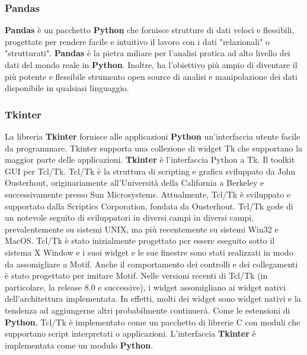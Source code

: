 \subsubsection{Pandas}
\textbf{Pandas} è un pacchetto \textbf{Python} che fornisce strutture di dati veloci e flessibili, progettate per rendere facile e intuitivo il lavoro con i dati "relazionali" o "strutturati". \textbf{Pandas} è la pietra miliare per l'analisi pratica ad alto livello dei dati del mondo reale in \textbf{Python}. Inoltre, ha l'obiettivo più ampio di diventare il più potente e flessibile strumento open source di analisi e manipolazione dei dati disponibile in qualsiasi linguaggio\cite{reback2020pandas}. 

\subsubsection{Tkinter}
La libreria \textbf{Tkinter} fornisce alle applicazioni \textbf{Python} un'interfaccia utente facile da programmare. Tkinter supporta una collezione di widget Tk che supportano la maggior parte delle applicazioni. \textbf{Tkinter} è l'interfaccia Python a Tk. Il toolkit GUI per Tcl/Tk. Tcl/Tk è la struttura di scripting e grafica sviluppato da John Ousterhout, originariamente all'Università della California a Berkeley e successivamente presso Sun Microsystems. Attualmente, Tcl/Tk è sviluppato e supportato dalla Scriptics Corporation, fondata da Ousterhout. Tcl/Tk gode di un notevole seguito di sviluppatori in diversi campi in diversi campi, prevalentemente su sistemi UNIX, ma più recentemente su sistemi Win32 e MacOS.\newline
Tcl/Tk è stato inizialmente progettato per essere eseguito sotto il sistema X Window e i suoi widget e le sue finestre sono stati realizzati in modo da assomigliare a Motif. Anche il comportamento dei controlli e dei collegamenti è stato progettato per imitare Motif. Nelle versioni recenti di Tcl/Tk (in particolare, la release 8.0 e successive), i widget assomigliano ai widget nativi dell'architettura implementata. In effetti, molti dei widget sono widget nativi e la tendenza ad aggiungerne altri probabilmente continuerà. Come le estensioni di \textbf{Python}, Tcl/Tk è implementato come un pacchetto di librerie C con moduli che supportano script interpretati o applicazioni. L'interfaccia \textbf{Tkinter} è implementata come un modulo \textbf{Python}\cite{grayson2000python}.

